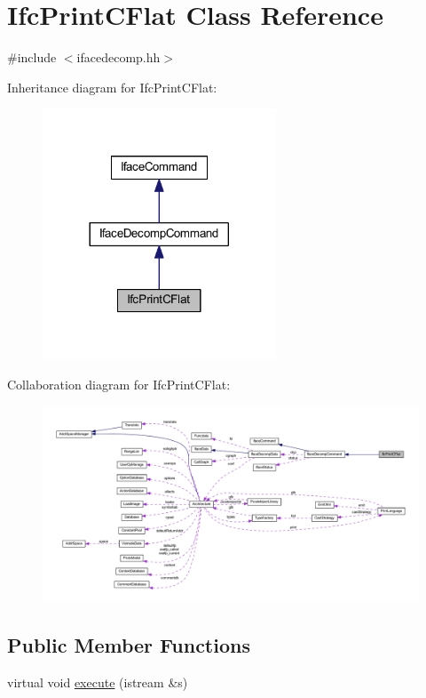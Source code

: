 \hypertarget{class_ifc_print_c_flat}{}\section{Ifc\+Print\+C\+Flat Class Reference}
\label{class_ifc_print_c_flat}


{\ttfamily \#include $<$ifacedecomp.\+hh$>$}



Inheritance diagram for Ifc\+Print\+C\+Flat\+:
\nopagebreak
\begin{figure}[H]
\begin{center}
\leavevmode
\includegraphics[width=197pt]{class_ifc_print_c_flat__inherit__graph}
\end{center}
\end{figure}


Collaboration diagram for Ifc\+Print\+C\+Flat\+:
\nopagebreak
\begin{figure}[H]
\begin{center}
\leavevmode
\includegraphics[width=350pt]{class_ifc_print_c_flat__coll__graph}
\end{center}
\end{figure}
\subsection*{Public Member Functions}
\begin{DoxyCompactItemize}
\item 
virtual void \mbox{\hyperlink{class_ifc_print_c_flat_a11c64bab560c5aaee612235a4d84d785}{execute}} (istream \&s)
\end{DoxyCompactItemize}
